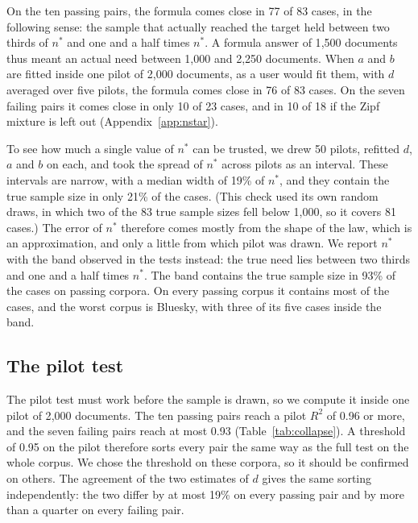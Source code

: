 On the ten passing pairs, the formula comes close in 77 of 83 cases, in the following sense: the sample that actually reached the target held between two thirds of $n^{*}$ and one and a half times $n^{*}$. A formula answer of 1{,}500 documents thus meant an actual need between 1{,}000 and 2{,}250 documents. When $a$ and $b$ are fitted inside one pilot of 2{,}000 documents, as a user would fit them, with $d$ averaged over five pilots, the formula comes close in 76 of 83 cases. On the seven failing pairs it comes close in only 10 of 23 cases, and in 10 of 18 if the Zipf mixture is left out (Appendix~\ref{app:nstar}).

To see how much a single value of $n^{*}$ can be trusted, we drew 50 pilots, refitted $d$, $a$ and $b$ on each, and took the spread of $n^{*}$ across pilots as an interval. These intervals are narrow, with a median width of 19\% of $n^{*}$, and they contain the true sample size in only 21\% of the cases. (This check used its own random draws, in which two of the 83 true sample sizes fell below 1{,}000, so it covers 81 cases.) The error of $n^{*}$ therefore comes mostly from the shape of the law, which is an approximation, and only a little from which pilot was drawn. We report $n^{*}$ with the band observed in the tests instead: the true need lies between two thirds and one and a half times $n^{*}$. The band contains the true sample size in 93\% of the cases on passing corpora. On every passing corpus it contains most of the cases, and the worst corpus is Bluesky, with three of its five cases inside the band.

\subsection{The pilot test}
\label{sec:diag}

The pilot test must work before the sample is drawn, so we compute it inside one pilot of 2{,}000 documents. The ten passing pairs reach a pilot $R^2$ of 0.96 or more, and the seven failing pairs reach at most 0.93 (Table~\ref{tab:collapse}). A threshold of 0.95 on the pilot therefore sorts every pair the same way as the full test on the whole corpus. We chose the threshold on these corpora, so it should be confirmed on others. The agreement of the two estimates of $d$ gives the same sorting independently: the two differ by at most 19\% on every passing pair and by more than a quarter on every failing pair.

